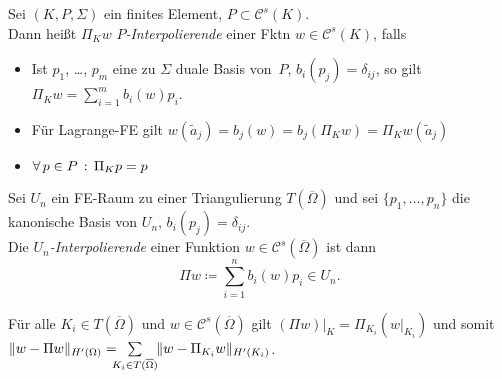 \documentclass{cheat-sheet}
\newcommand{\Cont}{\mathcal{C}} %
\newcommand{\clos}[1]{\overline{#1}} %
\newcommand{\cOmega}{\clos{\Omega}} %
\begin{document}
\begin{defn}
  Sei $(K, P, \Sigma)$ ein finites Element, $P \subset \Cont^s(K)$. \\
  Dann heißt $\Pi_K w$ \emph{$P$-Interpolierende} einer Fktn $w \in \Cont^s(K)$, falls
  \begin{itemize}
  \end{itemize}
\end{defn}

\begin{bem}
  \begin{itemize}
    \item Ist $p_1$, \ldots, $p_m$ eine zu $\Sigma$ duale Basis von~$P$, \dh{} $b_i(p_j) = \delta_{ij}$, so gilt $\Pi_K w = {\sum}_{i=1}^m b_i(w) p_i$.
    \item Für Lagrange-FE gilt \enspace
    $w(\tilde{a}_j) = b_j(w) = b_j(\Pi_K w) = \Pi_K w(\tilde{a}_j)$
    \item $\forall \, {p \in P} \,:\, \Pi_K p = p$
  \end{itemize}
\end{bem}


\begin{defn}
  Sei $U_n$ ein FE-Raum zu einer Triangulierung $T(\cOmega)$ und sei $\{ p_1, \ldots, p_n \}$ die kanonische Basis von $U_n$, \dh{} $b_i(p_j) = \delta_{ij}$. \\
  Die \emph{$U_n$-Interpolierende} einer Funktion $w \in \Cont^s(\cOmega)$ ist dann
  \[
    \Pi w \coloneqq \sum_{i=1}^n b_i(w) p_i \in U_n.
  \]
\end{defn}

\begin{lem}
  Für alle $K_i \in T(\cOmega)$ und $w \in \Cont^s(\cOmega)$ gilt $(\Pi w) |_K = \Pi_{K_i} (w|_{K_i})$ und somit $\norm{w - \Pi w}_{H'(\Omega)} = \enspace \sum_{\mathclap{K_i \in T(\cOmega)}} \quad \norm{w - \Pi_{K_i} w}_{H'(K_i)}$.
\end{lem}
\end{document}
